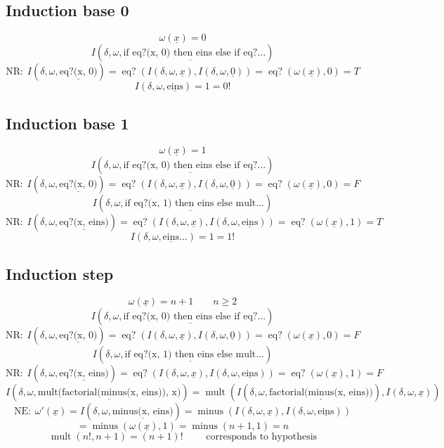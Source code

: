 \documentclass[11pt]{article}
\renewcommand{\u}[1]{\underline{#1}}
\renewcommand{\u}[1]{\underline{#1}}
\newcommand{\NE}{\text{NE:}\hspace{5pt}}
\newcommand{\NR}{\text{NR:}\hspace{5pt}}
\begin{document}
\subsection{Induction base 0}
\[
  \omega(\u{x}) = 0
\] \[
  I(\delta, \omega, \u{\text{if eq?(x, 0) then eins else if eq?}}\ldots)
\] \[
  \NR I(\delta, \omega, \u{\text{eq?(x, 0)}})
    = \operatorname{eq?}(I(\delta, \omega, \u{x}), I(\delta, \omega, \u{0}))
    = \operatorname{eq?}(\omega(\u{x}), 0)
    = T
\] \[
  I(\delta, \omega, \u{\text{eins}}) = 1 = 0!
\]

\subsection{Induction base 1}
%
\[
  \omega(\u{x}) = 1
\] \[
  I(\delta, \omega, \u{\text{if eq?(x, 0) then eins else if eq?}}\ldots)
\] \[
  \NR I(\delta, \omega, \u{\text{eq?(x, 0)}})
    = \operatorname{eq?}(I(\delta, \omega, \u{x}), I(\delta, \omega, \u{0}))
    = \operatorname{eq?}(\omega(\u{x}), 0)
    = F
\] \[
  I(\delta, \omega, \u{\text{if eq?(x, 1) then eins else mult}}\ldots)
\] \[
  \NR I(\delta, \omega, \u{\text{eq?(x, eins)}})
    = \operatorname{eq?}(I(\delta, \omega, \u{x}), I(\delta, \omega, \u{\text{eins}}))
    = \operatorname{eq?}(\omega(\u{x}), 1)
    = T
\] \[
  I(\delta, \omega, \u{\text{eins}}\ldots) = 1 = 1!
\]

\subsection{Induction step}
%
\[
  \omega(\u{x}) = n + 1 \qquad n \geq 2
\] \[
  I(\delta, \omega, \u{\text{if eq?(x, 0) then eins else if eq?}}\ldots)
\] \[
  \NR I(\delta, \omega, \u{\text{eq?(x, 0)}})
    = \operatorname{eq?}(I(\delta, \omega, \u{x}), I(\delta, \omega, \u{0}))
    = \operatorname{eq?}(\omega(\u{x}), 0)
    = F
\] \[
  I(\delta, \omega, \u{\text{if eq?(x, 1) then eins else mult}}\ldots)
\] \[
  \NR I(\delta, \omega, \u{\text{eq?(x, eins)}})
    = \operatorname{eq?}(I(\delta, \omega, \u{x}), I(\delta, \omega, \u{\text{eins}}))
    = \operatorname{eq?}(\omega(\u{x}), 1)
    = F
\] \[
  I(\delta, \omega, \u{\text{mult(factorial(minus(x, eins)), x)}})
    = \operatorname{mult}(I(\delta, \omega, \u{\text{factorial(minus(x, eins))}}), I(\delta, \omega, \u{x}))
\] \[
  \NE \omega'(\u{x})
    = I(\delta, \omega, \u{\text{minus(x, eins)}})
    = \operatorname{minus}(I(\delta, \omega, \u{x}), I(\delta, \omega, \u{\text{eins}}))
\] \[
    = \operatorname{minus}(\omega(\u{x}), 1)
    = \operatorname{minus}(n + 1, 1) = n
\] \[
  \operatorname{mult}(n!, n+1) = (n+1)! \qquad \text{ corresponds to hypothesis}
\]
\end{document}

